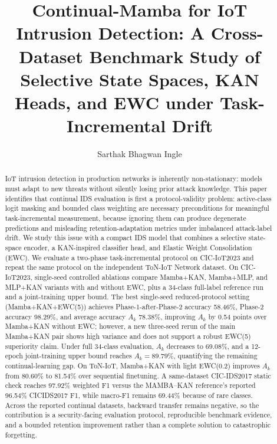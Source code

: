 \documentclass[a4paper,fleqn]{cas-dc}
\begin{document}
\let\WriteBookmarks\relax
\def\floatpagepagefraction{1}
\def\textpagefraction{.001}


\title [mode = title]{Continual-Mamba for IoT Intrusion Detection: A Cross-Dataset Benchmark Study of Selective State Spaces, KAN Heads, and EWC under Task-Incremental Drift}

\author[1]{Sarthak Bhagwan Ingle}
\cormark[1]



\begin{abstract}
IoT intrusion detection in production networks is inherently non-stationary: models must adapt to new threats without silently losing prior attack knowledge. This paper identifies that continual IDS evaluation is first a protocol-validity problem: active-class logit masking and bounded class weighting are necessary preconditions for meaningful task-incremental measurement, because ignoring them can produce degenerate predictions and misleading retention-adaptation metrics under imbalanced attack-label drift. We study this issue with a compact IDS model that combines a selective state-space encoder, a KAN-inspired classifier head, and Elastic Weight Consolidation (EWC). We evaluate a two-phase task-incremental protocol on CIC-IoT2023 and repeat the same protocol on the independent ToN-IoT Network dataset. On CIC-IoT2023, single-seed controlled ablations compare Mamba+KAN, Mamba+MLP, and MLP+KAN variants with and without EWC, plus a 34-class full-label reference run and a joint-training upper bound. The best single-seed reduced-protocol setting (Mamba+KAN+EWC(5)) achieves Phase-1-after-Phase-2 accuracy 58.46\%, Phase-2 accuracy 98.29\%, and average accuracy $A_k$ 78.38\%, improving $A_k$ by 0.54 points over Mamba+KAN without EWC; however, a new three-seed rerun of the main Mamba+KAN pair shows high variance and does not support a robust EWC(5) superiority claim. Under full 34-class evaluation, $A_k$ decreases to 69.08\%, and a 12-epoch joint-training upper bound reaches $A_k=89.79\%$, quantifying the remaining continual-learning gap. On ToN-IoT, Mamba+KAN with light EWC(0.2) improves $A_k$ from 80.60\% to 81.54\% over sequential finetuning. A same-dataset CIC-IDS2017 static check reaches 97.92\% weighted F1 versus the MAMBA--KAN reference's reported 96.54\% CICIDS2017 F1, while macro-F1 remains 69.44\% because of rare classes. Across the reported continual datasets, backward transfer remains negative, so the contribution is a security-facing evaluation protocol, reproducible benchmark evidence, and a bounded retention improvement rather than a complete solution to catastrophic forgetting.
\end{abstract}
\end{document}
